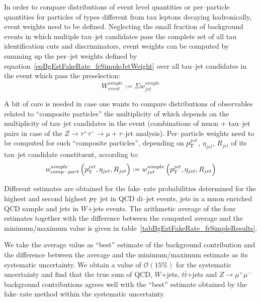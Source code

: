 In order to compare distributions of event level quantities or per--particle
quantities for particles of types different from tau leptons decaying
hadronically, event weights need to be defined.  Neglecting the small fraction
of background events in which multiple tau--jet candidates pass the complete set
of all tau identification cuts and discriminators, event weights can be computed
by summing up the per--jet weights defined by
equation~\ref{eqBgEstFakeRate_frSimpleJetWeight} over all tau--jet candidates in
the event which pass the preselection:
\begin{equation}
W_{event}^{simple} := \Sigma w_{jet}^{simple}
\label{eqBgEstFakeRate_frSimpleEventWeight}
\end{equation}

A bit of care is needed in case one wants to compare distributions of
observables related to ``composite particles'' the multiplicity of which depends
on the multiplicity of tau--jet candidates in the event (\eg combinations of
muon + tau--jet pairs in case of the $Z \rightarrow \tau^{+} \tau^{-}
\rightarrow \mu + \tau\mbox{--jet}$ analysis).  Per--particle weights need to be
computed for such ``composite particles'', depending on $p_{\mathrm{T}}^{jet}$,
$\eta_{jet}$, $R_{jet}$ of its tau--jet candidate constituent, according to:
\begin{equation}
w_{comp-part}^{simple} \left( p_{\mathrm{T}}^{jet}, \eta_{jet}, R_{jet} \right) := 
  w_{jet}^{simple} \left( p_{\mathrm{T}}^{jet}, \eta_{jet}, R_{jet} \right)
\label{eqBgEstFakeRate_frSimpleCompositeParticleWeight}
\end{equation}

Different estimates are obtained for the fake--rate probabilities determined for
the highest and second highest $p_{\mathrm{T}}$ jet in QCD di--jet events, jets in a muon
enriched QCD sample and jets in $W$+jets events.  The arithmetic average of the
four estimates together with the difference between the computed average and the
minimum/maximum value is given in table~\ref{tabBgEstFakeRate_frSimpleResults}.

We take the average value as ``best'' estimate of the background contribution
and the difference between the average and the minimum/maximum estimate as its
systematic uncertainty.  We obtain a value of $\mathcal{O} \left( 15 \% \right)$
for the systematic uncertainty and find that the true sum of QCD, $W$+jets,
$t\bar{t}$+jets and $Z \rightarrow \mu^{+} \mu^{-}$ background contributions
agrees well with the ``best'' estimate obtained by the fake--rate method within
the systematic uncertainty.

